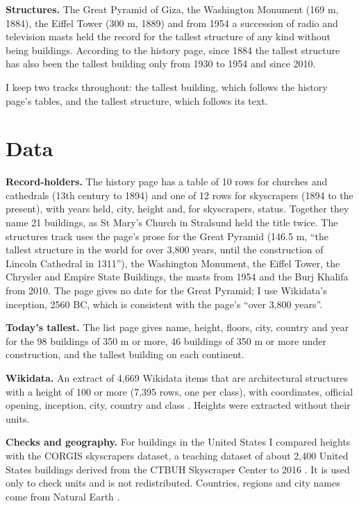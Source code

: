 \documentclass[11pt,a4paper]{article}
\begin{document}
\textbf{Structures.} The Great Pyramid of Giza, the Washington Monument (169 m, 1884), the Eiffel Tower (300 m, 1889) and from 1954 a succession of radio and television masts held the record for the tallest structure of any kind without being buildings. According to the history page, since 1884 the tallest structure has also been the tallest building only from 1930 to 1954 and since 2010.

I keep two tracks throughout: the tallest building, which follows the history page's tables, and the tallest structure, which follows its text.

\section{Data}
\textbf{Record-holders.} The history page \citep{wphist} has a table of 10 rows for churches and cathedrals (13th century to 1894) and one of 12 rows for skyscrapers (1894 to the present), with years held, city, height and, for skyscrapers, status. Together they name 21 buildings, as St Mary's Church in Stralsund held the title twice. The structures track uses the page's prose for the Great Pyramid (146.5 m, ``the tallest structure in the world for over 3,800 years, until the construction of Lincoln Cathedral in 1311''), the Washington Monument, the Eiffel Tower, the Chrysler and Empire State Buildings, the masts from 1954 and the Burj Khalifa from 2010. The page gives no date for the Great Pyramid; I use Wikidata's inception, 2560 BC, which is consistent with the page's ``over 3,800 years''.

\textbf{Today's tallest.} The list page \citep{wplist} gives name, height, floors, city, country and year for the 98 buildings of 350 m or more, 46 buildings of 350 m or more under construction, and the tallest building on each continent.

\textbf{Wikidata.} An extract of 4,669 Wikidata items that are architectural structures with a height of 100 or more (7,395 rows, one per class), with coordinates, official opening, inception, city, country and class \citep{wikidata}. Heights were extracted without their units.

\textbf{Checks and geography.} For buildings in the United States I compared heights with the CORGIS skyscrapers dataset, a teaching dataset of about 2,400 United States buildings derived from the CTBUH Skyscraper Center to 2016 \citep{corgis}. It is used only to check units and is not redistributed. Countries, regions and city names come from Natural Earth \citep{naturalearth}.
\end{document}
